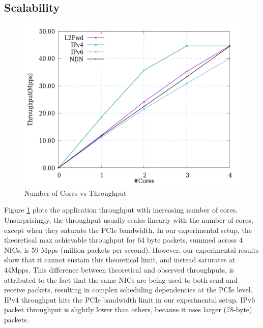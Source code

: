 \subsection{Scalability}
\label{scalability}
\begin{figure}[ht]
\includegraphics[width = \linewidth]{Figures/cores.png}
\caption{Number of Cores vs Throughput}
\label{cores}
\end{figure}
Figure \ref{cores} plots the application throughput with increasing number of cores.
Unsurprisingly, the throughput usually scales linearly with the number of cores, except when
they saturate the PCIe bandwidth. In our experimental setup, the theoretical max achievable
throughput for 64 byte packets, summed across 4 NICs, is 59 Mpps (million packets per second). However, our
experimental results show that it cannot sustain this theoretical limit, and instead
saturates at 44Mpps. This difference between theoretical and observed throughputs,
is attributed to the fact that the same NICs are being used to both send and
receive packets, resulting in complex scheduling dependencies at the PCIe level.
IPv4 throughput hits the PCIe bandwidth limit in our experimental setup.
IPv6 packet throughput is slightly lower than others, because it uses larger
(78-byte) packets.

%

